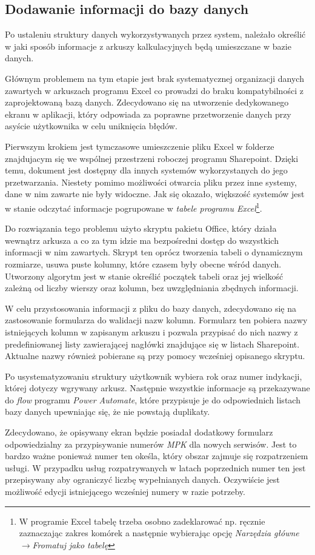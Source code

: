 \subsection{Dodawanie informacji do bazy danych}
Po ustaleniu struktury danych wykorzystywanych przez system, należało określić w jaki sposób informacje z arkuszy kalkulacyjnych będą umieszczane w bazie danych.

Głównym problemem na tym etapie jest brak systematycznej organizacji danych zawartych w arkuszach programu Excel co prowadzi do braku kompatybilności z zaprojektowaną bazą danych. 
Zdecydowano się na utworzenie dedykowanego ekranu w aplikacji, który odpowiada za poprawne przetworzenie danych przy asyście użytkownika w celu uniknięcia błędów.

Pierwszym krokiem jest tymczasowe umieszczenie pliku Excel w folderze znajdujacym się we wspólnej przestrzeni roboczej programu Sharepoint. Dzięki temu, dokument jest dostępny dla innych systemów wykorzystanych do jego przetwarzania. Niestety pomimo możliwości otwarcia pliku przez inne systemy, dane w nim zawarte nie były widoczne. Jak się okazało, większość systemów jest w stanie odczytać informacje pogrupowane w \emph{tabele programu Excel}\footnote{W programie Excel tabelę trzeba osobno zadeklarować np. ręcznie zaznaczając zakres komórek a następnie wybierając opcję \emph{Narzędzia główne}$\to$\emph{Fromatuj jako tabelę}}.

Do rozwiązania tego problemu użyto skryptu pakietu Office, który działa wewnątrz arkusza a co za tym idzie ma bezpośredni dostęp do wszystkich informacji w nim zawartych. Skrypt ten oprócz tworzenia tabeli o dynamicznym rozmiarze, usuwa puste kolumny, które czasem były obecne wśród danych. Utworzony algorytm jest w stanie określić początek tabeli oraz jej wielkość zależną od liczby wierszy oraz kolumn, bez uwzględniania zbędnych informacji.

W celu przystosowania informacji z pliku do bazy danych, zdecydowano się na zastosowanie formularza do walidacji nazw kolumn. Formularz ten pobiera nazwy istniejących kolumn w zapisanym arkuszu i pozwala przypisać do nich nazwy z predefiniowanej listy zawierającej nagłówki znajdujące się w listach Sharepoint. Aktualne nazwy również pobierane są przy pomocy wcześniej opisanego skryptu.

Po usystematyzowaniu struktury użytkownik wybiera rok oraz numer indykacji, której dotyczy wgrywany arkusz. Następnie wszystkie informacje są przekazywane do \emph{flow} programu \emph{Power Automate}, które przypisuje je do odpowiednich listach bazy danych upewniając się, że nie powstają duplikaty.

Zdecydowano, że opisywany ekran będzie posiadał dodatkowy formularz odpowiedzialny za przypisywanie numerów \emph{MPK} dla nowych serwisów. Jest to bardzo ważne ponieważ numer ten okeśla, który obszar zajmuje się rozpatrzeniem usługi. W przypadku usług rozpatrywanych w latach poprzednich numer ten jest przepisywany aby ograniczyć liczbę wypełnianych danych. Oczywiście jest możliwość edycji istniejącego wcześniej numery w razie potrzeby. 